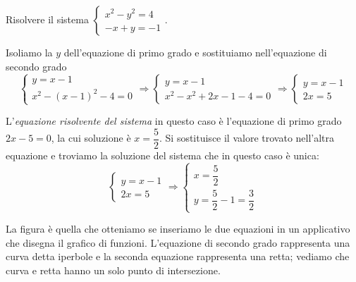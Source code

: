 \begin{esempio}
Risolvere il sistema 
\(\left\{\begin{array}{l}x^2-y^2=4\\-x+y=-1\end{array}\right.\).

Isoliamo la \(y\) dell'equazione di primo grado e sostituiamo nell'equazione di 
secondo grado 
\[\left\{\begin{array}{l}y=x-1 \\
x^2-(x-1)^2-4=0\end{array}\right.
\Rightarrow \left\{\begin{array}{l}y=x-1 \\
x^2-x^2+2x-1-4=0\end{array}\right.
\Rightarrow \left\{\begin{array}{l}y=x-1\\2x=5\end{array}\right.\]

L'\emph{equazione risolvente del sistema} in questo caso è l'equazione di 
primo grado \(2x-5=0\), la cui soluzione è \(x=\dfrac 5 2\). Si sostituisce 
il valore trovato nell'altra equazione e troviamo la soluzione del sistema 
che in questo caso è unica: 
\[\left\{\begin{array}{l}y=x-1 \\2x=5\end{array}\right. 
\Rightarrow\left\{\begin{array}{l}x=\dfrac 5 2 \\
y=\dfrac 5 2-1=\dfrac 3 2\end{array}\right.\] 

\begin{multicols}{2}
La figura è quella che otteniamo se inseriamo le due equazioni in un 
applicativo 
che disegna il grafico di funzioni. L'equazione di secondo grado rappresenta 
una curva detta iperbole e la seconda equazione rappresenta una retta; 
vediamo che curva e retta hanno un solo punto di intersezione.
\begin{center}

\end{center}
\end{multicols}
\end{esempio}
